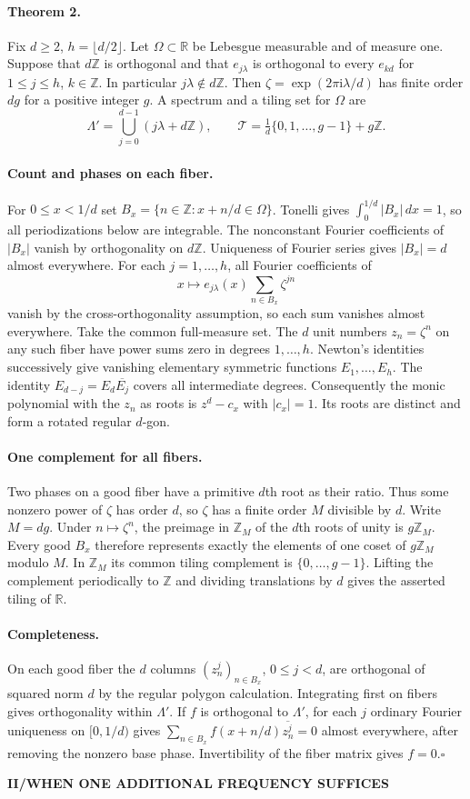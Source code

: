 \documentclass[11pt,a4paper]{article}
\newcommand{\kicker}[1]{\par{\sffamily\bfseries\color{teal}\small #1}\par}
\newcommand{\R}{\mathbb R}\newcommand{\Z}{\mathbb Z}\newcommand{\C}{\mathbb C}
\begin{document}
\paragraph{Theorem 2.} Fix $d\ge2$, $h=\lfloor d/2\rfloor$. Let $\Omega\subset\R$ be Lebesgue measurable and of measure one. Suppose that $d\Z$ is orthogonal and that $e_{j\lambda}$ is orthogonal to every $e_{kd}$ for $1\le j\le h$, $k\in\Z$. In particular $j\lambda\notin d\Z$. Then $\zeta=\exp(2\pi\mathrm i\lambda/d)$ has finite order $dg$ for a positive integer $g$. A spectrum and a tiling set for $\Omega$ are
\[
 \Lambda'=\bigcup_{j=0}^{d-1}(j\lambda+d\Z),
 \qquad \mathcal T=\tfrac1d\{0,1,\ldots,g-1\}+g\Z .
\]
\paragraph{Count and phases on each fiber.} For $0\le x<1/d$ set $B_x=\{n\in\Z:x+n/d\in\Omega\}$. Tonelli gives $\int_0^{1/d}|B_x|\,dx=1$, so all periodizations below are integrable. The nonconstant Fourier coefficients of $|B_x|$ vanish by orthogonality on $d\Z$. Uniqueness of Fourier series gives $|B_x|=d$ almost everywhere. For each $j=1,\ldots,h$, all Fourier coefficients of
\[
 x\longmapsto e_{j\lambda}(x)\!\sum_{n\in B_x}\zeta^{jn}
\]
vanish by the cross-orthogonality assumption, so each sum vanishes almost everywhere. Take the common full-measure set. The $d$ unit numbers $z_n=\zeta^n$ on any such fiber have power sums zero in degrees $1,\ldots,h$. Newton's identities successively give vanishing elementary symmetric functions $E_1,\ldots,E_h$. The identity $E_{d-j}=E_d\overline{E_j}$ covers all intermediate degrees. Consequently the monic polynomial with the $z_n$ as roots is $z^d-c_x$ with $|c_x|=1$. Its roots are distinct and form a rotated regular $d$-gon.
\paragraph{One complement for all fibers.} Two phases on a good fiber have a primitive $d$th root as their ratio. Thus some nonzero power of $\zeta$ has order $d$, so $\zeta$ has a finite order $M$ divisible by $d$. Write $M=dg$. Under $n\mapsto\zeta^n$, the preimage in $\Z_M$ of the $d$th roots of unity is $g\Z_M$. Every good $B_x$ therefore represents exactly the elements of one coset of $g\Z_M$ modulo $M$. In $\Z_M$ its common tiling complement is $\{0,\ldots,g-1\}$. Lifting the complement periodically to $\Z$ and dividing translations by $d$ gives the asserted tiling of $\R$.
\paragraph{Completeness.} On each good fiber the $d$ columns $(z_n^j)_{n\in B_x}$, $0\le j<d$, are orthogonal of squared norm $d$ by the regular polygon calculation. Integrating first on fibers gives orthogonality within $\Lambda'$. If $f$ is orthogonal to $\Lambda'$, for each $j$ ordinary Fourier uniqueness on $[0,1/d)$ gives $\sum_{n\in B_x}f(x+n/d)\overline{z_n^j}=0$ almost everywhere, after removing the nonzero base phase. Invertibility of the fiber matrix gives $f=0$.\hfill$\square$
\clearpage
{}
\kicker{II\quad /\quad WHEN ONE ADDITIONAL FREQUENCY SUFFICES}
\end{document}
